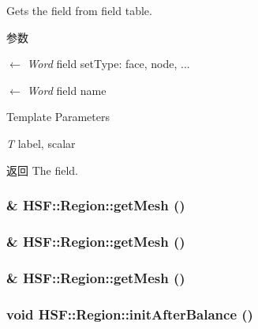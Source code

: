 Gets the field from field table. 
\begin{DoxyParams}{参数}
\item[\mbox{$\leftarrow$} {\em Word}]field setType: face, node, ... \item[\mbox{$\leftarrow$} {\em Word}]field name \end{DoxyParams}

\begin{DoxyTemplParams}{Template Parameters}
\item[{\em T}]label, scalar \end{DoxyTemplParams}
\begin{DoxyReturn}{返回}
The field. 
\end{DoxyReturn}
\hypertarget{classHSF_1_1Region_ab8349c21da1ed2153d3f0906dd571302}{
\subsubsection[{getMesh}]{\& HSF::Region::getMesh ()}}
\label{classHSF_1_1Region_ab8349c21da1ed2153d3f0906dd571302}
\hypertarget{classHSF_1_1Region_ab8349c21da1ed2153d3f0906dd571302}{
\subsubsection[{getMesh}]{\& HSF::Region::getMesh ()}}
\label{classHSF_1_1Region_ab8349c21da1ed2153d3f0906dd571302}
\hypertarget{classHSF_1_1Region_ab8349c21da1ed2153d3f0906dd571302}{
\subsubsection[{getMesh}]{\& HSF::Region::getMesh ()}}
\label{classHSF_1_1Region_ab8349c21da1ed2153d3f0906dd571302}
\hypertarget{classHSF_1_1Region_adb2b4937aae6fff73189a039b25eccfd}{
\subsubsection[{initAfterBalance}]{\setlength{\rightskip}{0pt plus 5cm}void HSF::Region::initAfterBalance ()}}
